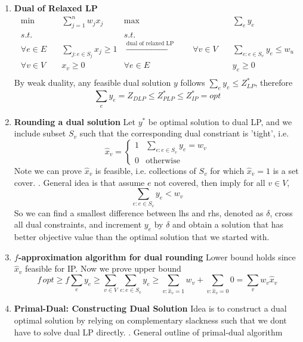 \documentclass[11pt]{article}
\begin{document}
\begin{enumerate}
    \item \textbf{Dual of Relaxed LP}
    \begin{align*}
        \min \quad & \sum_{j=1}^{n} w_j x_j 
        & 
        \max \quad & \sum_{e} y_e
        \\
        s.t. \quad & 
        &
        s.t. \quad &
        \\
        \forall e\in E \quad & \sum_{j: e\in S_j} x_j \geq 1 
        &   \overset{\text{dual of relaxed LP}}{\longrightarrow} \quad \quad 
        \forall v \in V \quad & \sum_{e: e\in S_v} y_e \leq w_u 
        \\
        \forall v\in V \quad & x_v \geq 0
        & 
        \forall e\in E \quad & y_e \geq 0
        \\ 
    \end{align*}
    By weak duality, any feasible dual solution $y$ follows $\textstyle \sum_e y_e \leq Z_{LP}^*$, therefore 
    \[
        \sum_e y_e = Z_{DLP} \leq Z_{PLP}^* \leq Z_{IP}^* = opt
    \]
    \item \textbf{Rounding a dual solution} Let $y^*$ be optimal solution to dual LP, and we include subset $S_v$ such that the corresponding dual constriant is 'tight', i.e. 
    \[
        \hat{x}_v = 
        \begin{cases}
            1 & \textstyle \sum_{e:e\in S_v} y_e = w_v \\
            0 & \text{otherwise}
        \end{cases}
    \]
    Note we can prove $\hat{x}_v$ is feasible, i.e. collections of $S_v$ for which $\hat{x}_v = 1$ is a set cover. . General idea is that assume $e$ not covered, then imply for all $v\in V$, 
    \[
        \sum_{e:e\in S_v} y_e < w_v
    \]
    So we can find a smallest difference between lhs and rhs, denoted as $\delta$, cross all dual constraints, and increment $y_e$ by $\delta$ and obtain a solution that has better objective value than the optimal solution that we started with.
    \item \textbf{$f$-approximation algorithm for dual rounding} Lower bound holds since $\hat{x}_v$ feasible for IP. Now we prove upper bound 
    \[
        f \, opt 
        \geq f \sum_e  y_e 
        \geq \sum_{v\in V} \sum_{e: e\in S_v} y_e 
        \geq \sum_{v:\hat{x}_v=1} w_v + \sum_{v:\hat{x}_v=0} 0
        = \sum_v w_v \hat{x}_v
    \]
    \item \textbf{Primal-Dual: Constructing Dual Solution} Idea is to construct a dual optimal solution by relying on complementary slackness such that we dont have to solve dual LP directly. . General outline of primal-dual algorithm  \\

\end{enumerate}
\end{document}
